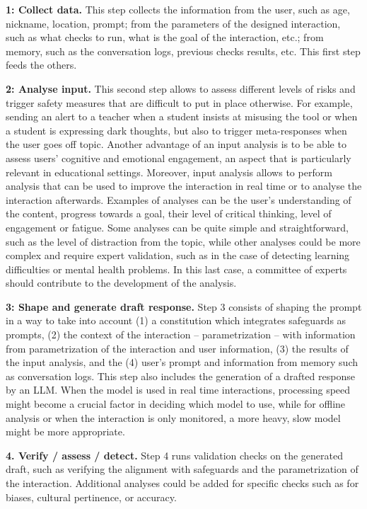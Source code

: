 \documentclass[fleqn,10pt]{wlscirep}
\begin{document}
\textbf{1: Collect data.} This step collects the information from the user, such as age, nickname, location, prompt; from the parameters of the designed interaction, such as what checks to run, what is the goal of the interaction, etc.; from memory, such as the conversation logs, previous checks results, etc. This first step feeds the others.

\textbf{2: Analyse input.} This second step allows to assess different levels of risks and trigger safety measures that are difficult to put in place otherwise. For example, sending an alert to a teacher when a student insists at misusing the tool or when a student is expressing dark thoughts, but also to trigger meta-responses when the user goes off topic. Another advantage of an input analysis is to be able to assess users' cognitive and emotional engagement, an aspect that is particularly relevant in educational settings. Moreover, input analysis allows to perform analysis that can be used to improve the interaction in real time or to analyse the interaction afterwards. Examples of analyses can be the user's understanding of the content, progress towards a goal, their level of critical thinking, level of engagement or fatigue. Some analyses can be quite simple and straightforward, such as the level of distraction from the topic, while other analyses could be more complex and require expert validation, such as in the case of detecting learning difficulties or mental health problems. In this last case, a committee of experts should contribute to the development of the analysis.

\textbf{3: Shape and generate draft response.} Step 3 consists of shaping the prompt in a way to take into account (1) a constitution which integrates safeguards as prompts, (2) the context of the interaction -- parametrization -- with information from parametrization of the interaction and user information, (3) the results of the input analysis, and the (4) user's prompt and information from memory such as conversation logs. This step also includes the generation of a drafted response by an LLM. When the model is used in real time interactions, processing speed might become a crucial factor in deciding which model to use, while for offline analysis or when the interaction is only monitored, a more heavy, slow model might be more appropriate.

\textbf{4. Verify / assess / detect.} Step 4 runs validation checks on the generated draft, such as verifying the alignment with safeguards and the parametrization of the interaction. Additional analyses could be added for specific checks such as for biases, cultural pertinence, or accuracy.
\end{document}
